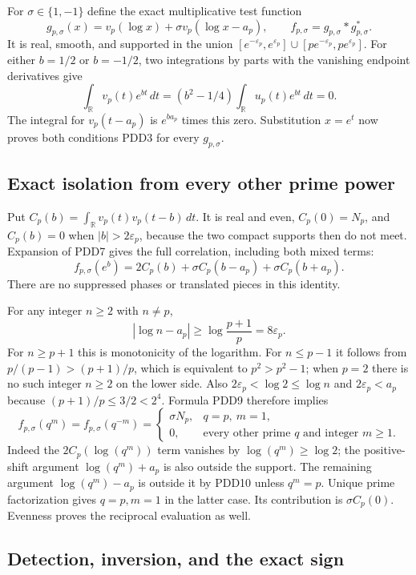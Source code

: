 \documentclass[11pt]{article}
\begin{document}
For $\sigma\in\{1,-1\}$ define the exact multiplicative
test function
\[
g_{p,\sigma}(x)=v_p(\log x)
                   +\sigma v_p(\log x-a_p),
\qquad f_{p,\sigma}=g_{p,\sigma}*g_{p,\sigma}^*.
\tag{PDD7}
\]
It is real, smooth, and supported in the union
$[e^{-\varepsilon_p},e^{\varepsilon_p}]
\cup[pe^{-\varepsilon_p},pe^{\varepsilon_p}]$.
For either $b=1/2$ or $b=-1/2$, two integrations by parts
with the vanishing endpoint derivatives give
\[
\int_{\mathbb R}v_p(t)e^{bt}\,dt
=(b^2-1/4)\int_{\mathbb R}u_p(t)e^{bt}\,dt=0.
\tag{PDD8}
\]
The integral for $v_p(t-a_p)$ is $e^{ba_p}$ times this
zero. Substitution $x=e^t$ now proves both conditions
PDD3 for every $g_{p,\sigma}$.

\subsection{Exact isolation from every other prime power}

Put $C_p(b)=\int_{\mathbb R}v_p(t)v_p(t-b)\,dt$.
It is real and even, $C_p(0)=N_p$, and
$C_p(b)=0$ when $|b|>2\varepsilon_p$, because the two
compact supports then do not meet. Expansion of PDD7
gives the full correlation, including both mixed terms:
\[
f_{p,\sigma}(e^b)
=2C_p(b)+\sigma C_p(b-a_p)+\sigma C_p(b+a_p).
\tag{PDD9}
\]
There are no suppressed phases or translated pieces in
this identity.

For any integer $n\geq2$ with $n\ne p$,
\[
|\log n-a_p|\geq\log\frac{p+1}{p}
                 =8\varepsilon_p.
\tag{PDD10}
\]
For $n\geq p+1$ this is monotonicity of the logarithm.
For $n\leq p-1$ it follows from
$p/(p-1)>(p+1)/p$, which is equivalent to
$p^2>p^2-1$; when $p=2$ there is no such integer
$n\geq2$ on the lower side. Also
$2\varepsilon_p<\log2\leq\log n$ and
$2\varepsilon_p<a_p$ because
$(p+1)/p\leq3/2<2^4$. Formula PDD9 therefore implies
\[
f_{p,\sigma}(q^m)=f_{p,\sigma}(q^{-m})
=\begin{cases}
\sigma N_p,&q=p,\ m=1,\\
0,&\text{every other prime }q\text{ and integer }m\geq1.
\end{cases}
\tag{PDD11}
\]
Indeed the $2C_p(\log(q^m))$ term vanishes by
$\log(q^m)\geq\log2$; the positive-shift argument
$\log(q^m)+a_p$ is also outside the support. The
remaining argument $\log(q^m)-a_p$ is outside it by
PDD10 unless $q^m=p$. Unique prime factorization gives
$q=p,m=1$ in the latter case. Its contribution is
$\sigma C_p(0)$. Evenness proves the reciprocal
evaluation as well.

\subsection{Detection, inversion, and the exact sign}
\end{document}
